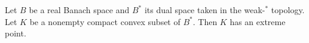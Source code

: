 
Let $B$ be a real Banach space and $B^*$ its dual space taken in the weak-$^*$ topology. Let $K$ be a nonempty compact convex subset of $B^*$. Then $K$ has an extreme point.
